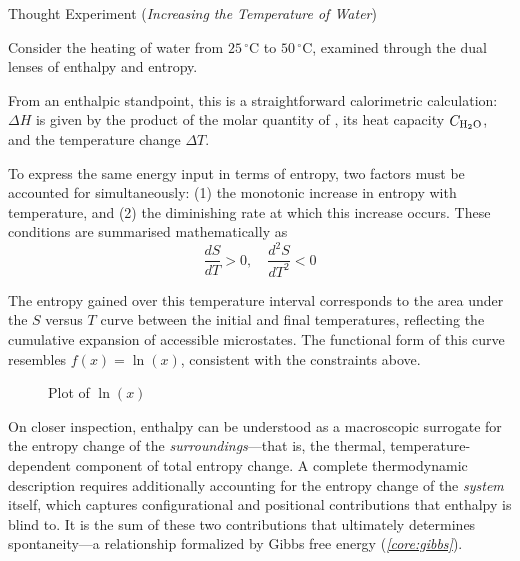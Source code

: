 \documentclass[10pt]{article}
\begin{document}
    \begin{core}{Thought Experiment (\textit{Increasing the Temperature of Water})}

      Consider the heating of water from $25\,^\circ$C to $50\,^\circ$C, examined through the dual lenses of enthalpy and entropy.

      From an enthalpic standpoint, this is a straightforward calorimetric calculation: $\Delta H$ is given by the product of the molar quantity of , its heat capacity $C_{\ce{H2O}}$, and the temperature change $\Delta T$.

      To express the same energy input in terms of entropy, two factors must be accounted for simultaneously: (1) the monotonic increase in entropy with temperature, and (2) the diminishing rate at which this increase occurs. These conditions are summarised mathematically as
      \[
        \frac{dS}{dT} > 0 , \quad \frac{d^2S}{dT^2} < 0
      \]

      The entropy gained over this temperature interval corresponds to the area under the $S$ versus $T$ curve between the initial and final temperatures, reflecting the cumulative expansion of accessible microstates. The functional form of this curve resembles $f(x) = \ln(x)$, consistent with the constraints above.

      \begin{figure}[H]
        \centering
        \caption{Plot of $\ln(x)$}
        \label{fig:lnx}
      \end{figure}

      On closer inspection, enthalpy can be understood as a macroscopic surrogate for the entropy change of the \textit{surroundings}---that is, the thermal, temperature-dependent component of total entropy change. A complete thermodynamic description requires additionally accounting for the entropy change of the \textit{system} itself, which captures configurational and positional contributions that enthalpy is blind to. It is the sum of these two contributions that ultimately determines spontaneity---a relationship formalized by Gibbs free energy (\textit{\autoref{core:gibbs}}).

    \end{core}
\end{document}
